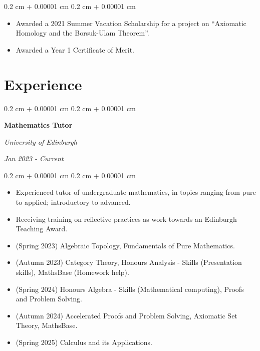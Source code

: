 \documentclass[10pt, letterpaper]{article}
\newenvironment{highlights}{
    \begin{itemize}[
        topsep=0.10 cm,
        parsep=0.10 cm,
        partopsep=0pt,
        itemsep=0pt,
        leftmargin=0.4 cm + 10pt
    ]
}{
    \end{itemize}
} %
\newenvironment{onecolentry}{
    \begin{adjustwidth}{
        0.2 cm + 0.00001 cm
    }{
        0.2 cm + 0.00001 cm
    }
}{
    \end{adjustwidth}
} %
\newenvironment{twocolentry}[2][]{
    \onecolentry
    \def\secondColumn{#2}
    \setcolumnwidth{\fill, 4.5 cm}
    \begin{paracol}{2}
}{
    \switchcolumn \raggedleft \secondColumn
    \end{paracol}
    \endonecolentry
} %
\begin{document}
        \vspace{0.10 cm}
        \begin{onecolentry}
            \begin{highlights}
                \item Awarded a 2021 Summer Vacation Scholarship for a project on “Axiomatic Homology and the Borsuk-Ulam Theorem”.
                \item Awarded a Year 1 Certificate of Merit.
            \end{highlights}
        \end{onecolentry}



    
    \section{Experience}



        
        \begin{twocolentry}{
 
            
        \textit{Jan 2023 - Current}}
            \textbf{Mathematics Tutor}
            
            \textit{University of Edinburgh}
        \end{twocolentry}

        \vspace{0.10 cm}
        \begin{onecolentry}
            \begin{highlights}
                \item Experienced tutor of undergraduate mathematics, in topics ranging from pure to applied; introductory to advanced.
                \item Receiving training on reflective practices as work towards an Edinburgh Teaching Award.
                \item (Spring 2023) Algebraic Topology, Fundamentals of Pure Mathematics.
                \item (Autumn 2023) Category Theory, Honours Analysis - Skills (Presentation skills), MathsBase (Homework help).
                \item (Spring 2024) Honours Algebra - Skills (Mathematical computing), Proofs and Problem Solving.
                \item (Autumn 2024) Accelerated Proofs and Problem Solving, Axiomatic Set Theory, MathsBase.
                \item (Spring 2025) Calculus and its Applications.
            \end{highlights}
        \end{onecolentry}
\end{document}
